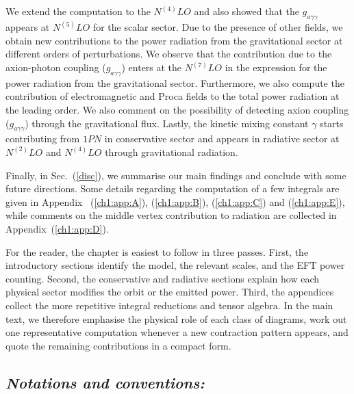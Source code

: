 We extend the computation to the $N^{(4)}LO$ and also showed that the $g_{a\gamma\gamma}$ appears at $N^{(5)}LO$ for the  scalar sector. Due to the presence of other fields, we obtain new contributions to the power radiation from the gravitational sector at different orders of perturbations. We observe that the contribution due to the axion-photon coupling ($g_{a\gamma\gamma}$) enters at the $N^{(7)}LO$ in the expression for the power radiation from the gravitational sector. Furthermore, we also compute the contribution of electromagnetic and Proca fields to the total power radiation at the leading order.  We also comment on the possibility of detecting axion coupling ($g_{a\gamma\gamma}$) through the gravitational flux. Lastly, the kinetic mixing constant $\gamma$ starts contributing from $1PN$ in conservative sector and appears in radiative sector at $N^{(2)}LO$ and $N^{(4)}LO$ through gravitational radiation.\par
Finally, in Sec.~(\ref{disc}), we summarise our main findings and conclude with some future directions. Some details regarding the computation of a few integrals are given in Appendix ~(\ref{ch1:app:A}), (\ref{ch1:app:B}), (\ref{ch1:app:C}) and (\ref{ch1:app:E}), while comments on the middle vertex contribution to radiation are collected in Appendix~(\ref{ch1:app:D}).

For the reader, the chapter is easiest to follow in three passes. First, the introductory sections identify the model, the relevant scales, and the EFT power counting. Second, the conservative and radiative sections explain how each physical sector modifies the orbit or the emitted power. Third, the appendices collect the more repetitive integral reductions and tensor algebra. In the main text, we therefore emphasise the physical role of each class of diagrams, work out one representative computation whenever a new contraction pattern appears, and quote the remaining contributions in a compact form.
\subsection*{\textbf{ \textit{Notations and conventions:}}}

